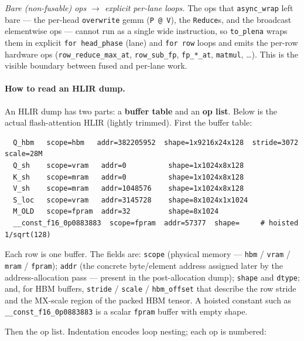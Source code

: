 \documentclass[
  10pt,
]{article}
\begin{document}
\emph{Bare (non-fusable) ops \(\rightarrow\) explicit per-lane loops.}
The ops that \texttt{async\_wrap} left bare --- the per-head
\texttt{overwrite} gemm (\texttt{P\,@\,V}), the \texttt{Reduce}s, and the
broadcast elementwise ops --- cannot run as a single wide instruction, so
\texttt{to\_plena} wraps them in explicit \texttt{for head\_phase} (lane)
and \texttt{for row} loops and emits the per-row hardware ops
(\texttt{row\_reduce\_max\_at}, \texttt{row\_sub\_fp}, \texttt{fp\_*\_at},
\texttt{matmul}, \dots). This is the visible boundary between fused and
per-lane work.

\paragraph{How to read an HLIR dump.}\label{frontend-read-hlir}

An HLIR dump has two parts: a \textbf{buffer table} and an \textbf{op
list}. Below is the actual flash-attention HLIR (lightly trimmed). First
the buffer table:

\begin{verbatim}
  Q_hbm   scope=hbm   addr=382205952  shape=1x9216x24x128  stride=3072  scale=28M
  Q_sh    scope=vram   addr=0          shape=1x1024x8x128
  K_sh    scope=mram   addr=0          shape=1x1024x8x128
  V_sh    scope=mram   addr=1048576    shape=1x1024x8x128
  S_loc   scope=vram   addr=3145728    shape=8x1024x1x1024
  M_OLD   scope=fpram  addr=32         shape=8x1024
  __const_f16_0p0883883  scope=fpram  addr=57377  shape=     # hoisted 1/sqrt(128)
\end{verbatim}

Each row is one buffer. The fields are: \texttt{scope} (physical memory
--- \texttt{hbm} / \texttt{vram} / \texttt{mram} / \texttt{fpram});
\texttt{addr} (the concrete byte/element address assigned later by the
address-allocation pass --- present in the post-allocation dump);
\texttt{shape} and \texttt{dtype}; and, for HBM buffers, \texttt{stride}
/ \texttt{scale} / \texttt{hbm\_offset} that describe the row stride and
the MX-scale region of the packed HBM tensor. A hoisted constant such as
\texttt{\_\_const\_f16\_0p0883883} is a scalar \texttt{fpram} buffer with
empty shape.

Then the op list. Indentation encodes loop nesting; each op is numbered:
\end{document}
